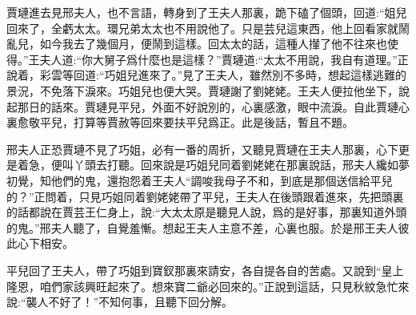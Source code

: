 \begin{parag}
    賈璉進去見邢夫人，也不言語，轉身到了王夫人那裏，跪下磕了個頭，回道:“姐兒回來了，全虧太太。環兄弟太太也不用說他了。只是芸兒這東西，他上回看家就鬧亂兒，如今我去了幾個月，便鬧到這樣。回太太的話，這種人攆了他不往來也使得。”王夫人道:“你大舅子爲什麼也是這樣？”賈璉道:“太太不用說，我自有道理。”正說着，彩雲等回道:“巧姐兒進來了。”見了王夫人，雖然別不多時，想起這樣逃難的景況，不免落下淚來。巧姐兒也便大哭。賈璉謝了劉姥姥。王夫人便拉他坐下，說起那日的話來。賈璉見平兒，外面不好說別的，心裏感激，眼中流淚。自此賈璉心裏愈敬平兒，打算等賈赦等回來要扶平兒爲正。此是後話，暫且不題。
\end{parag}


\begin{parag}
    邢夫人正恐賈璉不見了巧姐，必有一番的周折，又聽見賈璉在王夫人那裏，心下更是着急，便叫丫頭去打聽。回來說是巧姐兒同着劉姥姥在那裏說話，邢夫人纔如夢初覺，知他們的鬼，還抱怨着王夫人“調唆我母子不和，到底是那個送信給平兒的？”正問着，只見巧姐同着劉姥姥帶了平兒，王夫人在後頭跟着進來，先把頭裏的話都說在賈芸王仁身上，說:“大太太原是聽見人說，爲的是好事，那裏知道外頭的鬼。”邢夫人聽了，自覺羞慚。想起王夫人主意不差，心裏也服。於是邢王夫人彼此心下相安。
\end{parag}


\begin{parag}
    平兒回了王夫人，帶了巧姐到寶釵那裏來請安，各自提各自的苦處。又說到“皇上隆恩，咱們家該興旺起來了。想來寶二爺必回來的。”正說到這話，只見秋紋急忙來說:“襲人不好了！”不知何事，且聽下回分解。
\end{parag}